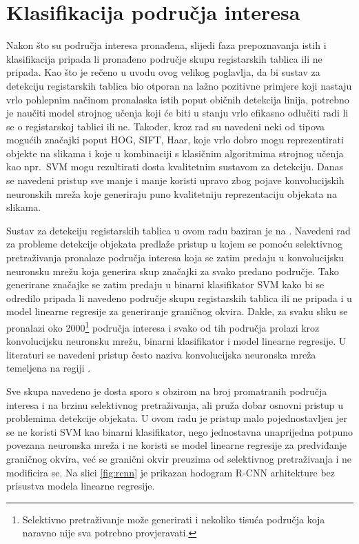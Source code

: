 \documentclass[times, utf8, diplomski]{fer}
\begin{document}
\section{Klasifikacija područja interesa}
Nakon što su područja interesa pronađena, slijedi faza prepoznavanja istih i klasifikacija pripada li pronađeno područje skupu registarskih tablica ili ne pripada. Kao što je rečeno u uvodu ovog velikog poglavlja, da bi sustav za detekciju registarskih tablica bio otporan na lažno pozitivne primjere koji nastaju vrlo pohlepnim načinom pronalaska istih poput običnih detekcija linija, potrebno je naučiti model strojnog učenja koji će biti u stanju vrlo efikasno odlučiti radi li se o registarskoj tablici ili ne. Također, kroz rad su navedeni neki od tipova mogućih značajki poput HOG, SIFT, Haar, koje vrlo dobro mogu reprezentirati objekte na slikama i koje u kombinaciji s klasičnim algoritmima strojnog učenja kao npr.\ SVM mogu rezultirati dosta kvalitetnim sustavom za detekciju. Danas se navedeni pristup sve manje i manje koristi upravo zbog pojave konvolucijskih neuronskih mreža koje generiraju puno kvalitetniju reprezentaciju objekata na slikama.

Sustav za detekciju registarskih tablica u ovom radu baziran je na \citep{rcnn-paper}. Navedeni rad za probleme detekcije objekata  predlaže pristup u kojem se pomoću selektivnog pretraživanja pronalaze područja interesa koja se zatim predaju u konvolucijsku neuronsku mrežu koja generira skup značajki za svako predano područje. Tako generirane značajke se zatim predaju u binarni klasifikator SVM kako bi se odredilo pripada li navedeno područje skupu registarskih tablica ili ne pripada i u model linearne regresije za generiranje graničnog okvira. Dakle, za svaku sliku se pronalazi oko 2000\footnote{Selektivno pretraživanje može generirati i nekoliko tisuća područja koja naravno nije sva potrebno provjeravati.} područja interesa i svako od tih područja prolazi kroz konvolucijsku neuronsku mrežu, binarni klasifikator i model linearne regresije. U literaturi se navedeni pristup često naziva konvolucijska neuronska mreža temeljena na regiji .

Sve skupa navedeno je dosta sporo s obzirom na broj promatranih područja interesa i na brzinu selektivnog pretraživanja, ali pruža dobar osnovni pristup  u problemima detekcije objekata. U ovom radu je pristup malo pojednostavljen jer se ne koristi SVM kao binarni klasifikator, nego jednostavna unaprijedna potpuno povezana neuronska mreža  i ne koristi se model linearne regresije za predviđanje graničnog okvira, već se granični okvir preuzima od selektivnog pretraživanja i ne modificira se. Na slici \ref{fig:rcnn} je prikazan hodogram R-CNN arhitekture bez prisustva modela linearne regresije.
\end{document}

